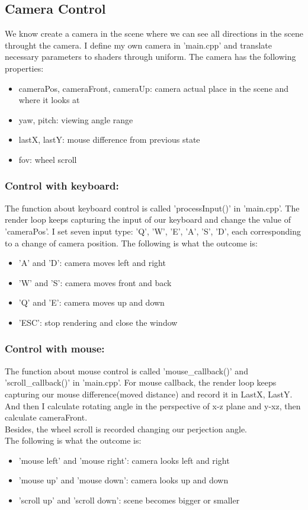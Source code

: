 \documentclass[acmtog]{acmart}
\begin{document}
\subsection{Camera Control}
We know create a camera in the scene where we can see all directions in the scene throught the camera. I define my own camera in 'main.cpp' and translate necessary parameters to shaders through uniform. The camera has the following properties:
\begin{itemize}
	\item cameraPos, cameraFront, cameraUp: camera actual place in the scene and where it looks at
	\item yaw, pitch: viewing angle range
	\item lastX, lastY: mouse difference from previous state
	\item fov: wheel scroll
\end{itemize}
\subsubsection{Control with keyboard: }
The function about keyboard control is called 'processInput()' in 'main.cpp'. The render loop keeps capturing the input of our keyboard and change the value of 'cameraPos'. I set seven input type: 'Q', 'W', 'E', 'A', 'S', 'D', each corresponding to a change of camera position. The following is what the outcome is:
\begin{itemize}
	\item 'A' and 'D': camera moves left and right
	\item 'W' and 'S': camera moves front and back
	\item 'Q' and 'E': camera moves up and down
	\item 'ESC': stop rendering and close the window
\end{itemize}
\subsubsection{Control with mouse: }
The function about mouse control is called 'mouse\_callback()' and 'scroll\_callback()' in 'main.cpp'. For mouse callback, the render loop keeps capturing our mouse difference(moved distance) and record it in LastX, LastY. And then I calculate rotating angle in the perspective of x-z plane and y-xz, then calculate cameraFront.\\
Besides, the wheel scroll is recorded changing our perjection angle.\\
The following is what the outcome is:
\begin{itemize}
	\item 'mouse left' and 'mouse right': camera looks left and right
	\item 'mouse up' and 'mouse down': camera looks up and down
	\item 'scroll up' and 'scroll down': scene becomes bigger or smaller
\end{itemize}
\end{document}
